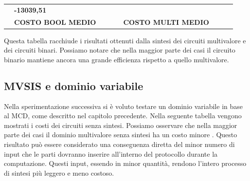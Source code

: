 \documentclass[
]{book}
\begin{document}
\begin{longtable}[]{@{}lllllllll@{}}
\begin{minipage}[t]{0.07\columnwidth}
\end{minipage} & \begin{minipage}[t]{0.07\columnwidth}\raggedright
\textbf{-13039,51}\strut
\end{minipage}\tabularnewline
\begin{minipage}[t]{0.07\columnwidth}\raggedright
\strut
\end{minipage} & \begin{minipage}[t]{0.11\columnwidth}\raggedright
\textbf{COSTO BOOL MEDIO}\strut
\end{minipage} & \begin{minipage}[t]{0.08\columnwidth}\raggedright
\strut
\end{minipage} & \begin{minipage}[t]{0.07\columnwidth}\raggedright
\strut
\end{minipage} & \begin{minipage}[t]{0.09\columnwidth}\raggedright
\strut
\end{minipage} & \begin{minipage}[t]{0.12\columnwidth}\raggedright
\textbf{COSTO MULTI MEDIO}\strut
\end{minipage} & \begin{minipage}[t]{0.08\columnwidth}\raggedright
\strut
\end{minipage} & \begin{minipage}[t]{0.07\columnwidth}\raggedright
\strut
\end{minipage} & \begin{minipage}[t]{0.07\columnwidth}\raggedright
\strut
\end{minipage}\tabularnewline
\bottomrule
\end{longtable}

Questa tabella racchiude i risultati ottenuti dalla sintesi dei circuiti multivalore e dei circuiti binari. Possiamo notare che nella maggior parte dei casi il circuito binario mantiene ancora una grande efficienza rispetto a quello multivalore.

\hypertarget{mvsis-e-dominio-variabile}{%
\subsection{MVSIS e dominio variabile}\label{mvsis-e-dominio-variabile}}

Nella sperimentazione successiva si è voluto testare un dominio variabile in base al MCD, come descritto nel capitolo precedente. Nella seguente tabella vengono mostrati i costi dei circuiti senza sintesi. Possiamo osservare che nella maggior parte dei casi il dominio multivalore senza sintesi ha un costo minore . Questo risultato può essere considerato una conseguenza diretta del minor numero di input che le parti dovranno inserire all'interno del protocollo durante la computazione. Questi input, essendo in minor quantità, rendono l'intero processo di sintesi più leggero e meno costoso.
\end{document}
